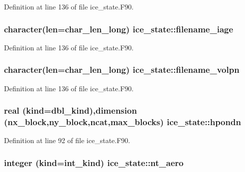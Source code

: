 Definition at line 136 of file ice\_\-state.F90.\hypertarget{namespaceice__state_ab39a4eb6530af3e7ded38f9876ddea95}{
\subsubsection[{filename\_\-iage}]{\setlength{\rightskip}{0pt plus 5cm}character(len=char\_\-len\_\-long) {\bf ice\_\-state::filename\_\-iage}}}
\label{namespaceice__state_ab39a4eb6530af3e7ded38f9876ddea95}


Definition at line 136 of file ice\_\-state.F90.\hypertarget{namespaceice__state_a56846a6e162a564a78e7ad6d8103aa19}{
\subsubsection[{filename\_\-volpn}]{\setlength{\rightskip}{0pt plus 5cm}character(len=char\_\-len\_\-long) {\bf ice\_\-state::filename\_\-volpn}}}
\label{namespaceice__state_a56846a6e162a564a78e7ad6d8103aa19}


Definition at line 136 of file ice\_\-state.F90.\hypertarget{namespaceice__state_aa0ef224575214fdcb3ea6ccc63645a2d}{
\subsubsection[{hpondn}]{\setlength{\rightskip}{0pt plus 5cm}real (kind=dbl\_\-kind),dimension (nx\_\-block,ny\_\-block,ncat,max\_\-blocks) {\bf ice\_\-state::hpondn}}}
\label{namespaceice__state_aa0ef224575214fdcb3ea6ccc63645a2d}


Definition at line 92 of file ice\_\-state.F90.\hypertarget{namespaceice__state_a17498b6cf9c7353f2704a5cd0b579718}{
\subsubsection[{nt\_\-aero}]{\setlength{\rightskip}{0pt plus 5cm}integer (kind=int\_\-kind) {\bf ice\_\-state::nt\_\-aero}}}
\label{namespaceice__state_a17498b6cf9c7353f2704a5cd0b579718}


